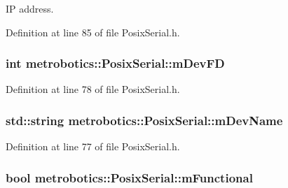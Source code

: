 \-I\-P address. 



\-Definition at line 85 of file \-Posix\-Serial.\-h.

\hypertarget{classmetrobotics_1_1PosixSerial_a96adceb87053360189a26efb47656750}{
\subsubsection[{m\-Dev\-F\-D}]{\setlength{\rightskip}{0pt plus 5cm}int {\bf metrobotics\-::\-Posix\-Serial\-::m\-Dev\-F\-D}}}\label{classmetrobotics_1_1PosixSerial_a96adceb87053360189a26efb47656750}


\-Definition at line 78 of file \-Posix\-Serial.\-h.

\hypertarget{classmetrobotics_1_1PosixSerial_a647c305dbdff7155b9f70503a5a4142b}{
\subsubsection[{m\-Dev\-Name}]{\setlength{\rightskip}{0pt plus 5cm}std\-::string {\bf metrobotics\-::\-Posix\-Serial\-::m\-Dev\-Name}}}\label{classmetrobotics_1_1PosixSerial_a647c305dbdff7155b9f70503a5a4142b}


\-Definition at line 77 of file \-Posix\-Serial.\-h.

\hypertarget{classmetrobotics_1_1PosixSerial_a68e19a9a6ed15bd9d0e2a0579a3630a1}{
\subsubsection[{m\-Functional}]{\setlength{\rightskip}{0pt plus 5cm}bool {\bf metrobotics\-::\-Posix\-Serial\-::m\-Functional}}}\label{classmetrobotics_1_1PosixSerial_a68e19a9a6ed15bd9d0e2a0579a3630a1}


